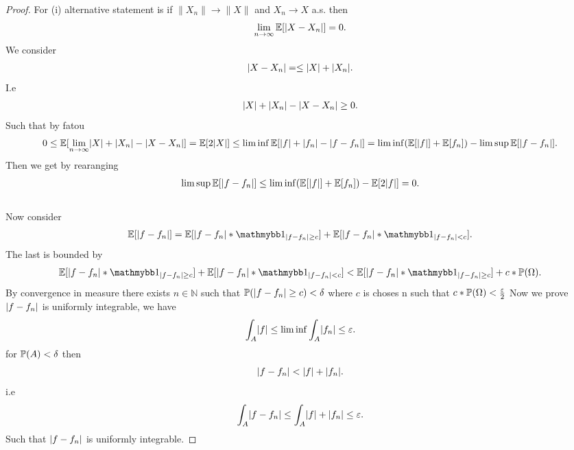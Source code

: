 \begin{proof}
  For (i)  alternative statement is if $\|X_n\| \to  \|X\|$ and $X_n \to X$  a.s. then
  \begin{align*}
    \lim_{n \to \infty} \E[\abs{X - X_n}]  = 0
  .\end{align*}
  We consider 
  \begin{align*}
    \abs{X-X_n} = \le  \abs{X} + \abs{X_n}
  .\end{align*}
 I.e 
 \begin{align*}
  \abs{X} + \abs{X_n} - \abs{X-X_n} \ge 0
 .\end{align*}
 Such that  by fatou 
 \begin{align*}
   0 \le \E[\lim_{n\to \infty} \abs{X} + \abs{X_n} - \abs{X-X_n}]  =   \E[2 \abs{X}] \le  \liminf \E[\abs{f} + \abs{f_n} - \abs{f-f_n}] = \liminf (\E[\abs{f}] + \E[f_n]) - \limsup \E[\abs{f-f_n}]
 .\end{align*}
 Then we get by rearanging
 \begin{align*}
   \limsup \E[\abs{f-f_n}] \le  \liminf (\E[\abs{f}] + \E[f_n]) - \E[2\abs{f}]  = 0
 .\end{align*}
 \\[1ex]
 Now consider 
 \begin{align*}
   \E[\abs{f-f_n}] = \E[\abs{f-f_n}*\cha_{\abs{f-f_n}\ge c}] +  \E[\abs{f-f_n}*\cha_{\abs{f-f_n}  < c}]
 .\end{align*}
 The last is bounded by 
 \begin{align*}
   \E[\abs{f-f_n}*\cha_{\abs{f-f_n}\ge c}] +  \E[\abs{f-f_n}*\cha_{\abs{f-f_n}  < c}] <  \E[\abs{f-f_n}*\cha_{\abs{f-f_n}\ge c}] + c*\P(\Omega)
 .\end{align*}
 By convergence in measure there exists $n \in  \mathbb{N}$ such that $\P(\abs{f-f_n} \ge c)<\delta $ where $c$ is choses n such that $c*\P(\Omega ) < \frac{\epsilon}{2} $ 
 Now we prove $\abs{f-f_n}$ is uniformly integrable, we have 
 \begin{align*}
  \int_A \abs{f} \le \liminf \int_A \abs{f_n} \le  \epsilon
 .\end{align*}
 for $\P(A) < \delta $ then 
 \begin{align*}
  \abs{f-f_n} < \abs{f} + \abs{f_n}
 .\end{align*}
 i.e 
 \begin{align*}
  \int_A \abs{f-f_n} \le  \int_A \abs{f} + \abs{f_n} \le  \epsilon
 .\end{align*}
 Such that $\abs{f-f_n}$ is uniformly integrable.
\end{proof}
